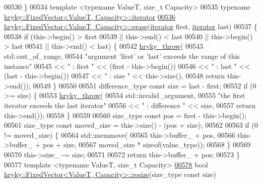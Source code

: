 \begin{DoxyCode}
00530 \}
00534 \textcolor{keyword}{template} <\textcolor{keyword}{typename} ValueT, \textcolor{keywordtype}{size\_t} Capacity>
00535 \textcolor{keyword}{typename} \hyperlink{classhryky_1_1iterator_1_1random_1_1_mutable}{hryky::FixedVector<ValueT, Capacity>::iterator}
\hypertarget{fixed__vector_8h_source_l00536}{}\hyperlink{classhryky_1_1_fixed_vector_a01e15b899a3d8372b38caeb04a54ceb2}{00536} \hyperlink{classhryky_1_1_fixed_vector}{hryky::FixedVector<ValueT, Capacity>::erase}(\hyperlink{classhryky_1_1iterator_1_1random_1_1_mutable}{iterator} first, \hyperlink{classhryky_1_1iterator_1_1random_1_1_mutable}{iterator} last)
00537 \{
00538     \textcolor{keywordflow}{if} (this->begin() > first
00539          || this->end() < last
00540          || this->begin() > last
00541          || this->end() < last) \{
00542         \hyperlink{debug__common_8h_af50606eac4009921527ddcaed392b2c2}{hryky_throw}(
00543             std::out\_of\_range,
00544             \textcolor{stringliteral}{"argument 'first' or 'last' exceeds the range of this instance"}
00545             << \textcolor{stringliteral}{" : first "} << (first - this->begin())
00546             << \textcolor{stringliteral}{" : last "} << (last - this->begin())
00547             << \textcolor{stringliteral}{" : size "} << this->size(),
00548             \textcolor{keywordflow}{return} this->end());
00549     \}
00550 
00551     difference\_type \textcolor{keyword}{const} size = last - first;
00552     \textcolor{keywordflow}{if} (0 >= size) \{
00553         \hyperlink{debug__common_8h_af50606eac4009921527ddcaed392b2c2}{hryky_throw}(
00554             std::invalid\_argument,
00555             \textcolor{stringliteral}{"the first iterator exceeds the last iterator"}
00556             << \textcolor{stringliteral}{" : difference "} << size,
00557             \textcolor{keywordflow}{return} this->end());
00558     \}
00559 
00560     size\_type \textcolor{keyword}{const} pos         = first - this->begin();
00561     size\_type \textcolor{keyword}{const} moved\_size  = this->size() - (pos + size);
00562 
00563     \textcolor{keywordflow}{if} (0 != moved\_size) \{
00564         std::memmove(
00565             this->buffer\_ + pos,
00566             this->buffer\_ + pos + size,
00567             moved\_size * \textcolor{keyword}{sizeof}(value\_type));
00568     \}
00569 
00570     this->size\_ -= size;
00571 
00572     \textcolor{keywordflow}{return} this->buffer\_ + pos;
00573 \}
00577 \textcolor{keyword}{template} <\textcolor{keyword}{typename} ValueT, \textcolor{keywordtype}{size\_t} Capacity>
\hypertarget{fixed__vector_8h_source_l00578}{}\hyperlink{classhryky_1_1_fixed_vector_a2e96859883b376cebe3b2e41c02c9e9a}{00578} \textcolor{keywordtype}{bool} \hyperlink{classhryky_1_1_fixed_vector}{hryky::FixedVector<ValueT, Capacity>::resize}(size\_type \textcolor{keyword}{const} size)

\end{DoxyCode}
